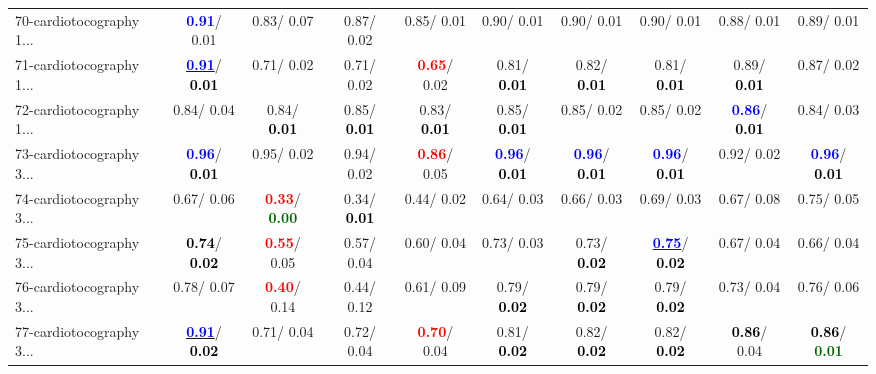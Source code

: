 \begin{table}[h]
\begin{center}
{\begin{tabular}{lc|c|c|c|c|c|c|c|c}
70-cardiotocography 1... & \textcolor{blue}{\textbf{  0.91}}/  0.01 &   0.83/  0.07 &   0.87/  0.02 &   0.85/  0.01 &   0.90/  0.01 &   0.90/  0.01 &   0.90/  0.01 &   0.88/  0.01 &   0.89/  0.01 \\
71-cardiotocography 1... & \underline{\textcolor{blue}{\textbf{  0.91}}}/\textcolor{black}{\textbf{  0.01}} &   0.71/  0.02 &   0.71/  0.02 & \textcolor{red}{\textbf{  0.65}}/  0.02 &   0.81/\textcolor{black}{\textbf{  0.01}} &   0.82/\textcolor{black}{\textbf{  0.01}} &   0.81/\textcolor{black}{\textbf{  0.01}} &   0.89/\textcolor{black}{\textbf{  0.01}} &   0.87/  0.02 \\ \hline
72-cardiotocography 1... &   0.84/  0.04 &   0.84/\textcolor{black}{\textbf{  0.01}} &   0.85/\textcolor{black}{\textbf{  0.01}} &   0.83/\textcolor{black}{\textbf{  0.01}} &   0.85/\textcolor{black}{\textbf{  0.01}} &   0.85/  0.02 &   0.85/  0.02 & \textcolor{blue}{\textbf{  0.86}}/\textcolor{black}{\textbf{  0.01}} &   0.84/  0.03 \\
73-cardiotocography 3... & \textcolor{blue}{\textbf{  0.96}}/\textcolor{black}{\textbf{  0.01}} &   0.95/  0.02 &   0.94/  0.02 & \textcolor{red}{\textbf{  0.86}}/  0.05 & \textcolor{blue}{\textbf{  0.96}}/\textcolor{black}{\textbf{  0.01}} & \textcolor{blue}{\textbf{  0.96}}/\textcolor{black}{\textbf{  0.01}} & \textcolor{blue}{\textbf{  0.96}}/\textcolor{black}{\textbf{  0.01}} &   0.92/  0.02 & \textcolor{blue}{\textbf{  0.96}}/\textcolor{black}{\textbf{  0.01}} \\
74-cardiotocography 3... &   0.67/  0.06 & \textcolor{red}{\textbf{  0.33}}/\textcolor{darkgreen}{\textbf{  0.00}} &   0.34/\textcolor{black}{\textbf{  0.01}} &   0.44/  0.02 &   0.64/  0.03 &   0.66/  0.03 &   0.69/  0.03 &   0.67/  0.08 &   0.75/  0.05 \\
75-cardiotocography 3... & \textcolor{black}{\textbf{  0.74}}/\textcolor{black}{\textbf{  0.02}} & \textcolor{red}{\textbf{  0.55}}/  0.05 &   0.57/  0.04 &   0.60/  0.04 &   0.73/  0.03 &   0.73/\textcolor{black}{\textbf{  0.02}} & \underline{\textcolor{blue}{\textbf{  0.75}}}/\textcolor{black}{\textbf{  0.02}} &   0.67/  0.04 &   0.66/  0.04 \\
76-cardiotocography 3... &   0.78/  0.07 & \textcolor{red}{\textbf{  0.40}}/  0.14 &   0.44/  0.12 &   0.61/  0.09 &   0.79/\textcolor{black}{\textbf{  0.02}} &   0.79/\textcolor{black}{\textbf{  0.02}} &   0.79/\textcolor{black}{\textbf{  0.02}} &   0.73/  0.04 &   0.76/  0.06 \\
77-cardiotocography 3... & \underline{\textcolor{blue}{\textbf{  0.91}}}/\textcolor{black}{\textbf{  0.02}} &   0.71/  0.04 &   0.72/  0.04 & \textcolor{red}{\textbf{  0.70}}/  0.04 &   0.81/\textcolor{black}{\textbf{  0.02}} &   0.82/\textcolor{black}{\textbf{  0.02}} &   0.82/\textcolor{black}{\textbf{  0.02}} & \textcolor{black}{\textbf{  0.86}}/  0.04 & \textcolor{black}{\textbf{  0.86}}/\textcolor{darkgreen}{\textbf{  0.01}} \\

\end{tabular}}
\end{center}
\end{table}
